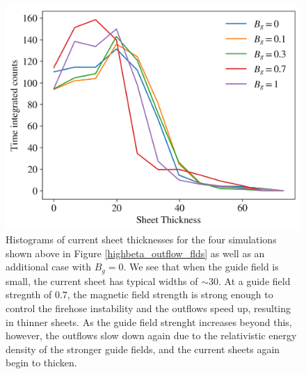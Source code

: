 \documentclass[iop,twocolappendix]{emulateapj}
\begin{document}
\begin{figure}[!h]
	\includegraphics[width=\linewidth]{sig_3_highbeta_thickness.png}
	\caption{Histograms of current sheet thicknesses for the four simulations shown above in Figure \ref{highbeta_outflow_flds} as well as an additional case with $B_{g}=0$.  We see that when the guide field is small, the current sheet has typical widths of $\sim30$.  At a guide field stregnth of $0.7$, the magnetic field strength is strong enough to control the firehose instability and the outflows speed up, resulting in thinner sheets.  As the guide field strenght increases beyond this, however, the outflows slow down again due to the relativistic energy density of the stronger guide fields, and the current sheets again begin to thicken.}
	
	\label{highbeta_outflow_thickness}
\end{figure}
\end{document}
